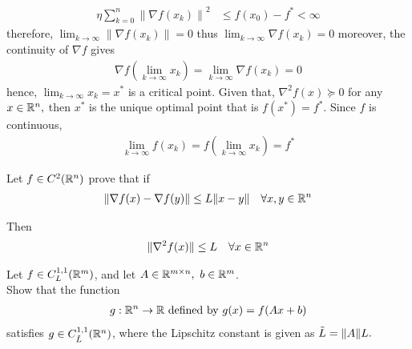 \documentclass{ExerciseSheet}
\newif\ifsolutions
\begin{document}
\begin{solution}
  \begin{align*}
      \eta\sum_{k=0}^{n}\left\|\nabla f(x_k)\right\|^2&\leq f(x_0) - f^*< \infty     
  \end{align*}
therefore,  $\displaystyle \lim_{k\to\infty}\left\|\nabla f(x_k)\right\|=0$ thus
 $\displaystyle \lim_{k\to\infty}\nabla f(x_k)=0$ moreover, the continuity of $\nabla f$ gives
 \begin{align*}
     \nabla f (\lim_{k\to\infty}x_k)= \lim_{k\to\infty}\nabla f(x_k)=0
 \end{align*}
hence, $\displaystyle\lim_{k\to\infty}x_k=x^*$ is a critical point. Given that,  $\nabla^2 f(x) \succcurlyeq 0$ for any $x \in \mathbb{R}^n,$ then $x^*$ is the unique optimal point that is $f(x^*)=f^*.$ Since $f$ is continuous, 
\begin{align*}
    \lim_{k\to\infty}f(x_k)= f(\lim_{k\to\infty}x_k)=f^*
\end{align*}
\end{solution}

\fi

\vskip 0.5cm

\begin{exo}
Let $f\in C^2(\mathbb{R}^n)$ prove that if
 \begin{align*}
     \| \nabla f(x) -\nabla f(y)\| \leq L \|x-y\| \quad \forall x,y \in \mathbb{R}^n
 \end{align*}

Then \begin{align*}
    \|\nabla^2 f(x)\|\leq L \quad \forall x\in \mathbb{R}^n
\end{align*}
	
\end{exo}

\ifsolutions
\vskip 0.3cm
\begin{solution}
\end{solution}

\fi

\vskip 0.5cm
\begin{exo}
Let $f \in C^{1,1}_L(\mathbb{R}^m)$, and let $A \in \mathbb{R}^{m\times n}, ~b\in \mathbb{R}^m$.\\
Show that the function 
 \begin{align*}
     g : \mathbb{R}^n \to \mathbb{R} \text{ defined by } g(x) = f(Ax+b)
 \end{align*}
 satisfies $g \in C^{1,1}_{\Tilde{L}}(\mathbb{R}^n)$, where the Lipschitz constant is given as $\Tilde{L} = \|A\|L.$
\end{exo}
\end{document}
